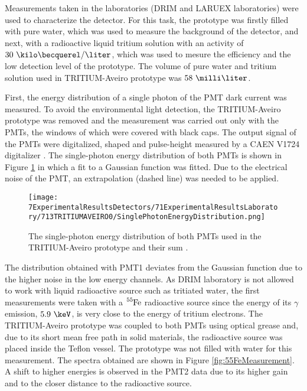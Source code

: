 Measurements taken in the laboratories (DRIM and LARUEX laboratories) were used to characterize the detector. For this task, the prototype was firstly filled with pure water, which was used to measure the background of the detector, and next, with a radioactive liquid tritium solution with an activity of $30~\kilo\becquerel/\liter$, which was used to mesure the efficiency and the low detection level of the prototype. The volume of pure water and tritium solution used in TRITIUM-Aveiro prototype was $58~\milli\liter$. 

First, the energy distribution of a single photon of the PMT dark current was measured. To avoid the environmental light detection, the TRITIUM-Aveiro prototype was removed and the measurement was carried out only with the PMTs, the windows of which were covered with black caps. The output signal of the PMTs were digitalized, shaped and pulse-height measured by a CAEN V1724 digitalizer \cite{CAENV1724}. The single-photon energy distribution of both PMTs is shown in Figure \ref{fig:SinglePhotonEnergyDistribution} in which a fit to a Gaussian function was fitted. Due to the electrical noise of the PMT, an extrapolation (dashed line) was needed to be applied.

\begin{figure}[h]
\centering
\texttt{[image: 7ExperimentalResultsDetectors/71ExperimentalResultsLaboratory/713TRITIUMAVEIRO0/SinglePhotonEnergyDistribution.png]}
\caption{The single-photon energy distribution of both PMTs used in the TRITIUM-Aveiro prototype and their sum \cite{ExperimentalPaperCarlos}.\label{fig:SinglePhotonEnergyDistribution}}
\end{figure}

The distribution obtained with PMT1 deviates from the Gaussian function due to the higher noise in the low energy channels. As DRIM laboratory is not allowed to work with liquid radioactive source such as tritiated water, the first measurements were taken with a $\ce{^{55}Fe}$ radioactive source since the energy of its $\gamma$ emission, $5.9~\keV$, is very close to the energy of tritium electrons. The TRITIUM-Aveiro prototype was coupled to both PMTs using optical grease and, due to its short mean free path in solid materials, the radioactive source was placed inside the Teflon vessel. The prototype was not filled with water for this measurement. The spectra obtained are shown in Figure \ref{fig:55FeMeasurement}. A shift to higher energies is observed in the PMT2 data due to its higher gain and to the closer distance to the radioactive source.

